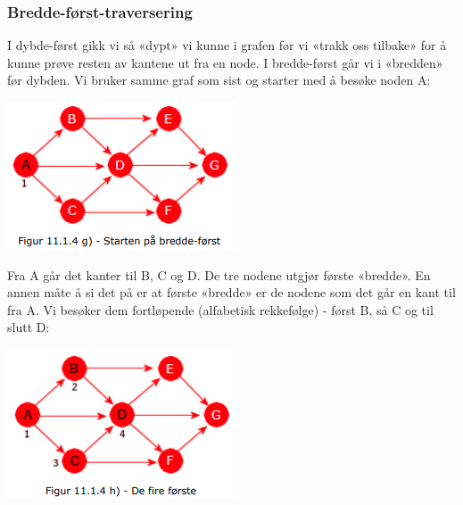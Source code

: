 \documentclass[11pt]{article}
\begin{document}
\newpage
        
        \subsubsection{Bredde-først-traversering}
            \begin{multicols}{2}
                I dybde-først gikk vi så «dypt» vi kunne i grafen før vi «trakk
                oss tilbake» for å kunne prøve resten av kantene ut fra en node. I bredde-først går vi i
                «bredden» før dybden. Vi bruker samme graf som sist og starter med å besøke noden A: 

                \columnbreak

                \includegraphics[center]{f-11.1.4g.png}
                
            \end{multicols}
            \begin{multicols}{2}
                Fra A går det kanter til B, C og D. De tre nodene utgjør første «bredde». En annen måte å si
                det på er at første «bredde» er de nodene som det går en kant til fra A. Vi besøker dem
                fortløpende (alfabetisk rekkefølge) - først B, så C og til slutt D: 

                \columnbreak

                \includegraphics[center]{f-11.1.4h.png}
                
            \end{multicols}
\end{document}
